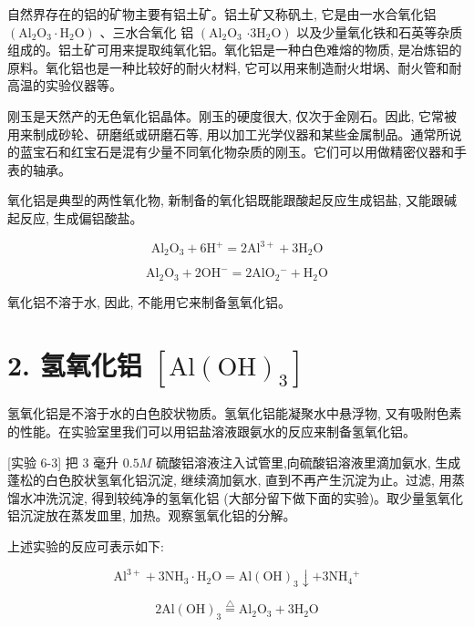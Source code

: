\documentclass[10pt]{article}
\begin{document}
自然界存在的铝的矿物主要有铝土矿。铝土矿又称矾土, 它是由一水合氧化铝 \(\left( {{\mathrm{{Al}}}_{2}{\mathrm{O}}_{3} \cdot {\mathrm{H}}_{2}\mathrm{O}}\right)\) 、三水合氧化 铝 \(\left( {{\mathrm{{Al}}}_{2}{\mathrm{O}}_{3}}\right.\) \(\left. {\cdot 3{\mathrm{H}}_{2}\mathrm{O}}\right)\) 以及少量氧化铁和石英等杂质组成的。铝土矿可用来提取纯氧化铝。氧化铝是一种白色难熔的物质, 是冶炼铝的原料。氧化铝也是一种比较好的耐火材料, 它可以用来制造耐火坩埚、耐火管和耐高温的实验仪器等。

刚玉是天然产的无色氧化铝晶体。刚玉的硬度很大, 仅次于金刚石。因此, 它常被用来制成砂轮、研磨纸或研磨石等, 用以加工光学仪器和某些金属制品。通常所说的蓝宝石和红宝石是混有少量不同氧化物杂质的刚玉。它们可以用做精密仪器和手表的轴承。

氧化铝是典型的两性氧化物, 新制备的氧化铝既能跟酸起反应生成铝盐, 又能跟碱起反应, 生成偏铝酸盐。

\[
{\mathrm{{Al}}}_{2}{\mathrm{O}}_{3} + 6{\mathrm{H}}^{ + } = 2{\mathrm{{Al}}}^{3 + } + 3{\mathrm{H}}_{2}\mathrm{O}
\]

\[
{\mathrm{{Al}}}_{2}{\mathrm{O}}_{3} + 2{\mathrm{{OH}}}^{ - } = 2{\mathrm{{AlO}}}_{2}{}^{ - } + {\mathrm{H}}_{2}\mathrm{O}
\]

氧化铝不溶于水, 因此, 不能用它来制备氢氧化铝。

\section*{2. 氢氧化铝 \(\left\lbrack {\mathrm{{Al}}{\left( \mathrm{{OH}}\right) }_{3}}\right\rbrack\)}

氢氧化铝是不溶于水的白色胶状物质。氢氧化铝能凝聚水中悬浮物, 又有吸附色素的性能。在实验室里我们可以用铝盐溶液跟氨水的反应来制备氢氧化铝。

[实验 6-3] 把 3 毫升 \({0.5M}\) 硫酸铝溶液注入试管里,向硫酸铝溶液里滴加氨水, 生成蓬松的白色胶状氢氧化铝沉淀, 继续滴加氨水, 直到不再产生沉淀为止。过滤, 用蒸馏水冲洗沉淀, 得到较纯净的氢氧化铝 (大部分留下做下面的实验)。取少量氢氧化铝沉淀放在蒸发皿里, 加热。观察氢氧化铝的分解。

上述实验的反应可表示如下:

\[
{\mathrm{{Al}}}^{3 + } + 3{\mathrm{{NH}}}_{3} \cdot {\mathrm{H}}_{2}\mathrm{O} = \mathrm{{Al}}{\left( \mathrm{{OH}}\right) }_{3} \downarrow + 3{\mathrm{{NH}}}_{4}{}^{ + }
\]

\[
2\mathrm{{Al}}{\left( \mathrm{{OH}}\right) }_{3}\overset{\bigtriangleup }{ = }{\mathrm{{Al}}}_{2}{\mathrm{O}}_{3} + 3{\mathrm{H}}_{2}\mathrm{O}
\]
\end{document}
